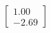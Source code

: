\documentclass[preview]{standalone}
\begin{document}
\begin{align*}
\begin{bmatrix} 1.00 \\ -2.69 \end{bmatrix}
\end{align*}
\end{document}
